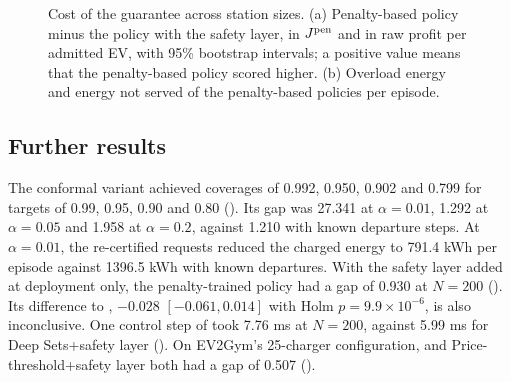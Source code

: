\begin{figure}[t]
\centering
{}
\caption{Cost of the guarantee across station sizes. (a) Penalty-based policy minus the policy with the safety layer, in $J^{\mathrm{pen}}$ and in raw profit per admitted EV, with 95\% bootstrap intervals; a positive value means that the penalty-based policy scored higher. (b) Overload energy and energy not served of the penalty-based policies per episode.}
\label{fig:cost}
\end{figure}

\subsection{Further results}\label{sec:res-further}

The conformal variant achieved coverages of 0.992, 0.950, 0.902 and 0.799 for targets of 0.99, 0.95, 0.90 and 0.80 ().
Its gap was 27.341 at $\alpha=0.01$, 1.292 at $\alpha=0.05$ and 1.958 at $\alpha=0.2$, against 1.210 with known departure steps.
At $\alpha=0.01$, the re-certified requests reduced the charged energy to 791.4 kWh per episode against 1396.5 kWh with known departures.
With the safety layer added at deployment only, the penalty-trained policy had a gap of 0.930 at $N=200$ ().
Its difference to \method{}, $-0.028$ $[-0.061,0.014]$ with Holm $p=9.9\times10^{-6}$, is also inconclusive.
One control step of \method{} took 7.76 ms at $N=200$, against 5.99 ms for Deep Sets+safety layer ().
On EV2Gym's 25-charger configuration, \method{} and Price-threshold+safety layer both had a gap of 0.507 ().

